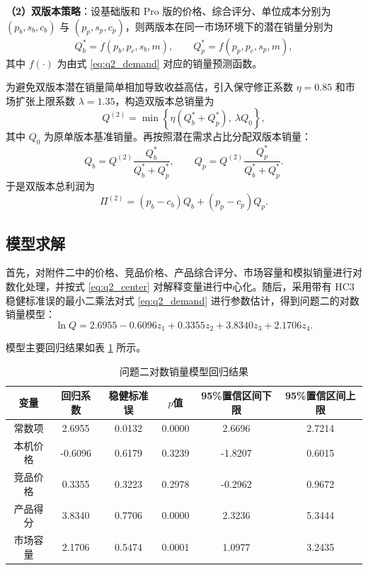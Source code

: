\documentclass[withoutpreface,bwprint]{cumcmthesis} %
\begin{document}
\textbf{（2）双版本策略}：设基础版和 Pro 版的价格、综合评分、单位成本分别为
$(p_b,s_b,c_b)$ 与 $(p_p,s_p,c_p)$，则两版本在同一市场环境下的潜在销量分别为
\begin{equation}
Q_b^\ast=f(p_b,p_c,s_b,m),\qquad
Q_p^\ast=f(p_p,p_c,s_p,m),
\label{eq:q2_potential}
\end{equation}
其中 $f(\cdot)$ 为由式 \eqref{eq:q2_demand} 对应的销量预测函数。

为避免双版本潜在销量简单相加导致收益高估，引入保守修正系数 $\eta=0.85$ 和市场扩张上限系数 $\lambda=1.35$，构造双版本总销量为
\begin{equation}
Q^{(2)}=\min\left\{\eta\left(Q_b^\ast+Q_p^\ast\right),\ \lambda Q_0\right\},
\label{eq:q2_dual_total}
\end{equation}
其中 $Q_0$ 为原单版本基准销量。再按照潜在需求占比分配双版本销量：
\begin{equation}
Q_b=Q^{(2)}\frac{Q_b^\ast}{Q_b^\ast+Q_p^\ast},\qquad
Q_p=Q^{(2)}\frac{Q_p^\ast}{Q_b^\ast+Q_p^\ast}.
\label{eq:q2_dual_split}
\end{equation}
于是双版本总利润为
\begin{equation}
\Pi^{(2)}=(p_b-c_b)Q_b+(p_p-c_p)Q_p.
\label{eq:q2_dual_profit}
\end{equation}

\subsection{模型求解}

首先，对附件二中的价格、竞品价格、产品综合评分、市场容量和模拟销量进行对数化处理，并按式 \eqref{eq:q2_center} 对解释变量进行中心化。随后，采用带有 HC3 稳健标准误的最小二乘法对式 \eqref{eq:q2_demand} 进行参数估计\cite{mackinnon1985}，得到问题二的对数销量模型：
\begin{equation}
\ln Q
=2.6955-0.6096z_1+0.3355z_2+3.8340z_3+2.1706z_4.
\label{eq:q2_final_model}
\end{equation}

模型主要回归结果如表 \ref{tab:q2_regression} 所示。

\begin{table}[!htbp]
\centering
\caption{问题二对数销量模型回归结果}
\label{tab:q2_regression}
\renewcommand{\arraystretch}{1.2}
\begin{tabular}{cccccc}
\hline
\rowcolor{headerblue}
变量 & 回归系数 & 稳健标准误 & $p$值 & 95\%置信区间下限 & 95\%置信区间上限 \\
\hline
常数项   & 2.6955 & 0.0132 & 0.0000 & 2.6696 & 2.7214 \\
本机价格 & -0.6096 & 0.6179 & 0.3239 & -1.8207 & 0.6015 \\
竞品价格 & 0.3355 & 0.3223 & 0.2978 & -0.2962 & 0.9672 \\
产品得分 & 3.8340 & 0.7706 & 0.0000 & 2.3236 & 5.3444 \\
市场容量 & 2.1706 & 0.5474 & 0.0001 & 1.0977 & 3.2435 \\
\hline
\end{tabular}
\end{table}
\end{document}
